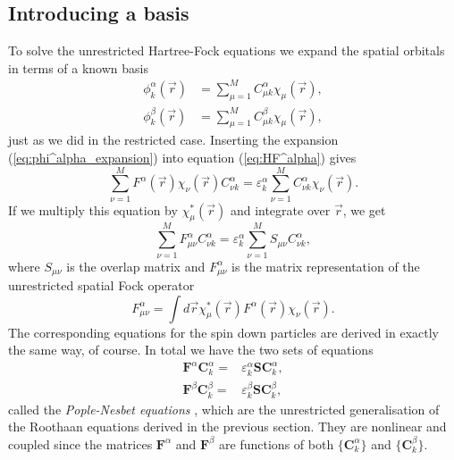 \subsection{Introducing a basis}
To solve the unrestricted Hartree-Fock equations we expand the spatial orbitals in terms of a known basis
\begin{align}
 \phi^\alpha_k(\vec r) & = \sum_{\mu=1}^M C^\alpha_{\mu k} \chi_\mu(\vec r), \label{eq:phi^alpha_expansion}\\
 \phi^\beta_k(\vec r) & = \sum_{\mu=1}^M C^\beta_{\mu k} \chi_\mu(\vec r), \label{eq:phi^beta_expansion}
\end{align}
just as we did in the restricted case. Inserting the expansion (\ref{eq:phi^alpha_expansion}) into equation (\ref{eq:HF^alpha}) gives
\begin{equation}
 \sum_{\nu=1}^M F^\alpha(\vec r)\chi_\nu(\vec r)C^\alpha_{\nu k} = \varepsilon^\alpha_k\sum_{\nu=1}^M C^\alpha_{\nu k}\chi_\nu(\vec r).
\end{equation}
If we multiply this equation by $\chi^*_\mu(\vec r)$ and integrate over $\vec r$, we get
\begin{equation}
 \sum_{\nu=1}^M F^\alpha_{\mu\nu}C^\alpha_{\nu k} = \varepsilon^\alpha_k\sum_{\nu=1}^M S_{\mu\nu}C^\alpha_{\nu k},
\end{equation}
where $S_{\mu\nu}$ is the overlap matrix and $F^\alpha_{\mu\nu}$ is the matrix representation of the unrestricted spatial Fock operator
\begin{equation}
\label{eq:Fmatrix^alpha}
 F^\alpha_{\mu\nu} = \int d\vec r \chi^*_\mu(\vec r) F^\alpha(\vec r)\chi_\nu(\vec r).
\end{equation}
The corresponding equations for the spin down particles are derived in exactly the same way, of course. In total we have the two sets of equations
\begin{align}
 \mathbf F^\alpha \mathbf C^\alpha_k = & \varepsilon^\alpha_k\mathbf{SC}^\alpha_k, \label{eq:pople-nesbet_up}\\
 \mathbf F^\beta \mathbf C^\beta_k = & \varepsilon^\beta_k\mathbf{SC}^\beta_k, \label{eq:pople-nesbet_down}
\end{align}
called the \emph{Pople-Nesbet equations} \cite{pople_nesbet}, which are the unrestricted generalisation of the Roothaan equations derived in the previous section. They are nonlinear
and coupled since the matrices $\mathbf F^\alpha$ and $\mathbf F^\beta$ are functions of both $\{\mathbf C^\alpha_k\}$ and $\{\mathbf C^\beta_k\}$.

